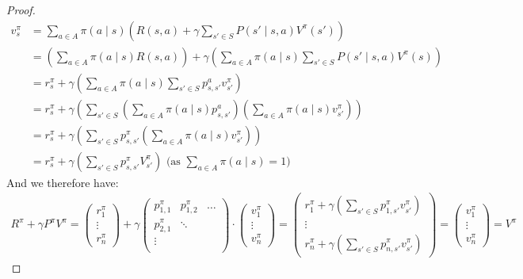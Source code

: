 \documentclass{article}
\theoremstyle{definition}
\theoremstyle{remark}
\theoremstyle{example}
\begin{document}
\begin{proof}
		\begin{align*}
				v^\pi_s &= \sum_{a \in A} \pi(a \mid s)(R(s, a) + \gamma \sum_{s' \in S} P(s' \mid s, a) V^\pi(s'))\\
						   &= (\sum_{a \in A} \pi(a \mid s)R(s, a)) + \gamma (\sum_{a \in A} \pi(a \mid s) \sum_{s' \in S} P(s' \mid s, a) V^\pi(s))\\
						   &= r^\pi_s + \gamma (\sum_{a \in A} \pi(a \mid s) \sum_{s' \in S} p^a_{s, s'} v^\pi_{s'})\\
						   &= r^\pi_s + \gamma (\sum_{s' \in S} (\sum_{a \in A} \pi(a \mid s) p^a_{s, s'}) (\sum_{a \in A} \pi(a \mid s) v^\pi_{s'}))\\
						   &= r^\pi_s + \gamma (\sum_{s' \in S} p^\pi_{s,s'} (\sum_{a \in A} \pi(a \mid s) v^\pi_{s'}))\\
						   &= r^\pi_s + \gamma (\sum_{s' \in S} p^\pi_{s, s'} V^\pi_{s'}) \text{ (as $\sum_{a \in A} \pi(a \mid s) = 1$)}
		\end{align*}
		And we therefore have:
		\begin{align*}
				R^\pi + \gamma P^\pi V^\pi = \begin{pmatrix} r^\pi_1 \\ \vdots \\ r^\pi_n \end{pmatrix} + \gamma \begin{pmatrix} p^\pi_{1,1} & p^\pi_{1,2} & \dots \\ p^\pi_{2,1} & \ddots & \\ \vdots & & \\ \end{pmatrix} \cdot \begin{pmatrix} v^\pi_1 \\ \vdots \\ v^\pi_n \end{pmatrix}
											= \begin{pmatrix} r^\pi_1 + \gamma (\sum_{s' \in S} p^\pi_{1,s'} v^\pi_{s'}) \\ \vdots \\ r^\pi_n + \gamma (\sum_{s' \in S} p^\pi_{n,s'} v^\pi_{s'}) \end{pmatrix}
											= \begin{pmatrix} v^\pi_1 \\ \vdots \\ v^\pi_n \end{pmatrix}
											= V^\pi
		\end{align*}
\end{proof}
\end{document}
